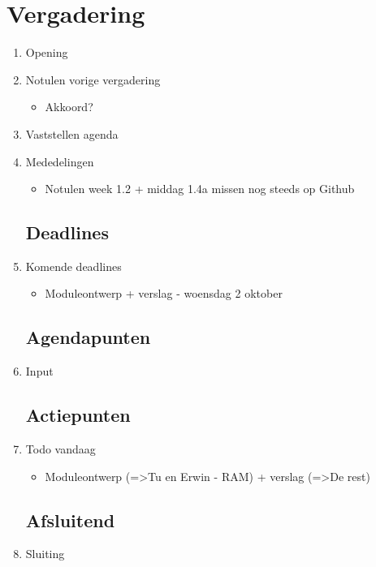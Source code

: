 \documentclass{article}
\begin{document}
\section*{Vergadering}
\begin{enumerate}
	
	\subsection*{Vooraf}
	\item Opening
	\item Notulen vorige vergadering
	\begin{itemize}
		\item Akkoord?
	\end{itemize}
	\item Vaststellen agenda
	\item Mededelingen
	\begin{itemize}
		\item Notulen week 1.2 + middag 1.4a missen nog steeds op Github
	\end{itemize}

	\subsection*{Deadlines}
	\item Komende deadlines
	\begin{itemize}
		\item Moduleontwerp + verslag - woensdag 2 oktober
	\end{itemize}

	\subsection*{Agendapunten}
	\item Input
	

	\subsection*{Actiepunten}
	\item Todo vandaag
	\begin{itemize}
		\item Moduleontwerp (=>Tu en Erwin - RAM) + verslag (=>De rest)
	\end{itemize}

	\noindent 
	\subsection*{Afsluitend}
	\item Sluiting

\end{enumerate}
\end{document}

